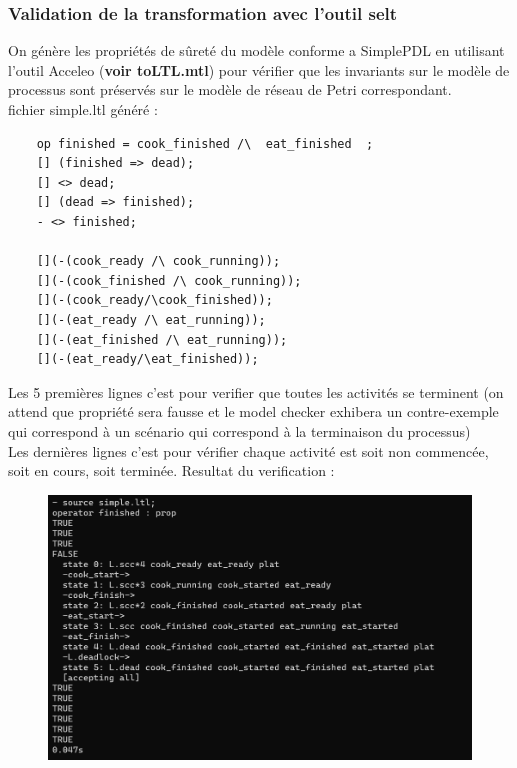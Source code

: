\documentclass{article}
\begin{document}
\subsubsection{Validation de la transformation avec l'outil selt}
On génère les propriétés de sûreté du modèle conforme a SimplePDL en utilisant l'outil Acceleo (\textbf{voir toLTL.mtl})
pour vérifier que les invariants sur le modèle de processus sont préservés sur le modèle de réseau de Petri correspondant. \\
fichier simple.ltl généré :
\begin{verbatim}
    op finished = cook_finished /\  eat_finished  ; 
    [] (finished => dead);
    [] <> dead;
    [] (dead => finished);
    - <> finished;

    [](-(cook_ready /\ cook_running));
    [](-(cook_finished /\ cook_running));
    [](-(cook_ready/\cook_finished));
    [](-(eat_ready /\ eat_running));
    [](-(eat_finished /\ eat_running));
    [](-(eat_ready/\eat_finished));
\end{verbatim}
Les 5 premières lignes c'est pour verifier que toutes les activités se terminent (on attend que propriété sera fausse et le model 
checker exhibera un contre-exemple qui correspond à un scénario qui correspond à la terminaison du processus) \\
Les dernières lignes c'est pour vérifier chaque activité est soit non commencée, soit en cours, soit terminée.
Resultat du verification :
\begin{figure}[H]
    \centering
    \includegraphics[width = 15cm]{selt-simple.png}
\end{figure}
\end{document}
